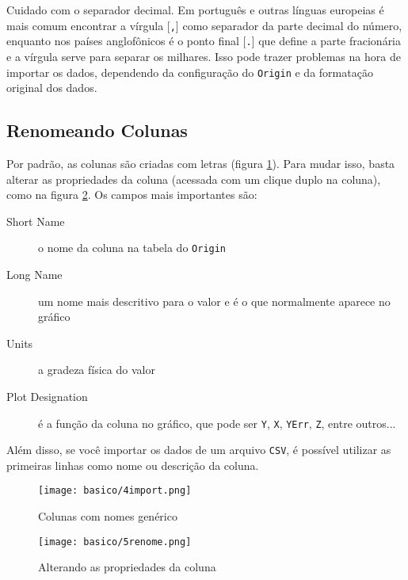     \begin{lembrete}
        Cuidado com o separador decimal. Em português e outras línguas europeias é mais comum encontrar a vírgula [\texttt{,}] como separador da parte decimal do número, enquanto nos países anglofônicos é o ponto final [\texttt{.}] que define a parte fracionária e a vírgula serve para separar os milhares. Isso pode trazer problemas na hora de importar os dados, dependendo da configuração do \texttt{Origin} e da formatação original dos dados.
    \end{lembrete}


\subsection{Renomeando Colunas} \label{sec:basico:renome}

    Por padrão, as colunas são criadas com letras (figura \ref{fig:basico:importado}). Para mudar isso, basta alterar as propriedades da coluna (acessada com um clique duplo na coluna), como na figura \ref{fig:basico:renomear}. Os campos mais importantes são:

    \begin{description}
        \item[Short Name] o nome da coluna na tabela do \texttt{Origin}
        \item[Long Name] um nome mais descritivo para o valor e é o que normalmente aparece no gráfico
        \item[Units] a gradeza física do valor
        \item[Plot Designation] é a função da coluna no gráfico, que pode ser \texttt{Y}, \texttt{X}, \texttt{YErr}, \texttt{Z}, entre outros...
    \end{description}

    Além disso, se você importar os dados de um arquivo \texttt{CSV}, é possível utilizar as primeiras linhas como nome ou descrição da coluna.

    \begin{figure}[htbp]
        \centering
        \texttt{[image: basico/4import.png]}

        \caption{Colunas com nomes genérico}
        \label{fig:basico:importado}
    \end{figure}

    \begin{figure}[htbp]
        \centering
        \texttt{[image: basico/5renome.png]}

        \caption{Alterando as propriedades da coluna}
        \label{fig:basico:renomear}
    \end{figure}
